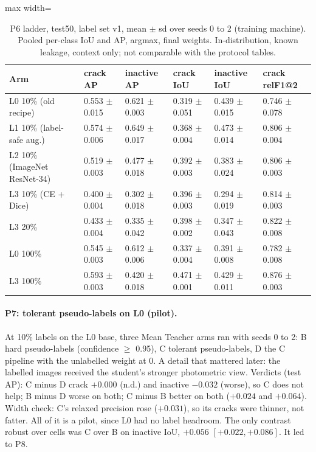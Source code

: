 \begin{table}[htbp]
\centering\small
\caption{P6 ladder, test50, label set v1, mean $\pm$ sd over seeds 0 to 2 (training machine). Pooled per-class IoU and AP, argmax,
final weights. In-distribution, known leakage, context only; not comparable with the protocol tables.}
\label{tab:pseries-p6}
\begin{adjustbox}{max width=\linewidth}
\begin{tabular}{@{}llllll@{}}
\toprule
Arm & crack AP & inactive AP & crack IoU & inactive IoU & crack relF1@2 \\
\midrule
L0 10\% (old recipe) & 0.553 $\pm$ 0.015 & 0.621 $\pm$ 0.003 & 0.319 $\pm$ 0.051 & 0.439 $\pm$ 0.015 & 0.746 $\pm$ 0.078 \\
L1 10\% (label-safe aug.) & 0.574 $\pm$ 0.006 & 0.649 $\pm$ 0.017 & 0.368 $\pm$ 0.004 & 0.473 $\pm$ 0.014 & 0.806 $\pm$ 0.004 \\
L2 10\% (ImageNet ResNet-34) & 0.519 $\pm$ 0.003 & 0.477 $\pm$ 0.018 & 0.392 $\pm$ 0.003 & 0.383 $\pm$ 0.024 & 0.806 $\pm$ 0.003 \\
L3 10\% (CE + Dice) & 0.400 $\pm$ 0.004 & 0.302 $\pm$ 0.018 & 0.396 $\pm$ 0.003 & 0.294 $\pm$ 0.019 & 0.814 $\pm$ 0.003 \\
L3 20\% & 0.433 $\pm$ 0.004 & 0.335 $\pm$ 0.042 & 0.398 $\pm$ 0.002 & 0.347 $\pm$ 0.043 & 0.822 $\pm$ 0.008 \\
L0 100\% & 0.545 $\pm$ 0.003 & 0.612 $\pm$ 0.006 & 0.337 $\pm$ 0.004 & 0.391 $\pm$ 0.008 & 0.782 $\pm$ 0.008 \\
L3 100\% & 0.593 $\pm$ 0.003 & 0.420 $\pm$ 0.018 & 0.471 $\pm$ 0.001 & 0.429 $\pm$ 0.011 & 0.876 $\pm$ 0.003 \\
\bottomrule
\end{tabular}
\end{adjustbox}
\end{table}

\paragraph{P7: tolerant pseudo-labels on L0 (pilot).} At 10\% labels on the L0 base, three Mean Teacher arms ran with seeds 0 to 2:
B hard pseudo-labels (confidence $\geq$ 0.95), C tolerant pseudo-labels, D the C pipeline with the unlabelled weight at 0. A detail
that mattered later: the labelled images received the student's stronger photometric view. Verdicts (test AP): C minus D crack
$+0.000$ (n.d.) and inactive $-0.032$ (worse), so C does not help; B minus D worse on both; C minus B better on both ($+0.024$ and
$+0.064$). Width check: C's relaxed precision rose ($+0.031$), so its cracks were thinner, not fatter. All of it is a pilot, since L0
had no label headroom. The only contrast robust over cells was C over B on inactive IoU, $+0.056$ $[+0.022, +0.086]$. It led to P8.

